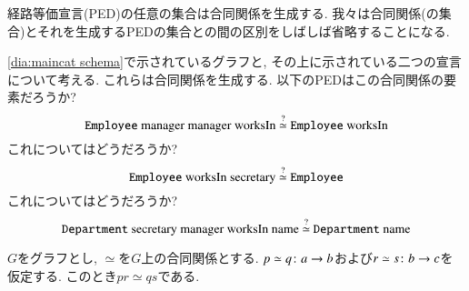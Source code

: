 
経路等価宣言(PED)の任意の集合は合同関係を生成する. 我々は合同関係(の集合)とそれを生成するPEDの集合との間の区別をしばしば省略することになる. 

\begin{exercise}\label{exc:generating congruence}
\eqref{dia:maincat schema}で示されているグラフと, その上に示されている二つの宣言について考える. これらは合同関係を生成する.
\sexc 以下のPEDはこの合同関係の要素だろうか? $$\tn{\texttt{Employee} manager manager worksIn $\stackrel{?}{\simeq}$ \texttt{Employee} worksIn}$$
\next これについてはどうだろうか? $$\tn{\texttt{Employee} worksIn secretary $\stackrel{?}{\simeq}$ \texttt{Employee}}$$
\next これについてはどうだろうか? $$\tn{\texttt{Department} secretary manager worksIn name $\stackrel{?}{\simeq}$ \texttt{Department} name}$$
\endsexc
\end{exercise}

\begin{lemma}\label{lemma:composing PEDs}


$G$をグラフとし, $\simeq$を$G$上の合同関係とする. $p\simeq q\colon a\rightarrow b$および$r\simeq s\colon b\rightarrow c$を仮定する. このとき$pr\simeq qs$である.

\end{lemma}

